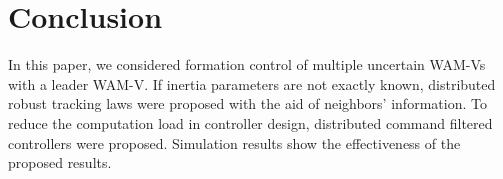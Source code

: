 \documentclass[letterpaper, 10 pt, conference]{ieeeconf}  %
\begin{document}
\section{Conclusion}
\label{sec6}

In this paper, we considered formation control of
multiple uncertain WAM-Vs with a leader WAM-V. If inertia parameters are not exactly known, distributed robust tracking laws were proposed with the aid of neighbors' information. To reduce the computation load in controller design, distributed command filtered controllers were proposed. Simulation results show the effectiveness of the proposed results.



\end{document}

